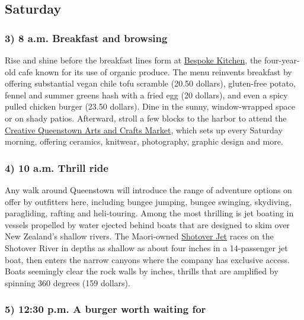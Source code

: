 \hypertarget{saturday}{%
\subsection{Saturday}\label{saturday}}

\hypertarget{3-8-am-breakfast-and-browsing}{%
\subsubsection{\texorpdfstring{\textbf{3) 8 a.m. Breakfast and
browsing}}{3) 8 a.m. Breakfast and browsing}}\label{3-8-am-breakfast-and-browsing}}

Rise and shine before the breakfast lines form at
\href{https://www.bespokekitchen.co.nz/}{Bespoke Kitchen}, the
four-year-old cafe known for its use of organic produce. The menu
reinvents breakfast by offering substantial vegan chile tofu scramble
(20.50 dollars), gluten-free potato, fennel and summer greens hash with
a fried egg (20 dollars), and even a spicy pulled chicken burger (23.50
dollars). Dine in the sunny, window-wrapped space or on shady patios.
Afterward, stroll a few blocks to the harbor to attend the
\href{http://www.queenstownmarket.com/}{Creative Queenstown Arts and
Crafts Market}, which sets up every Saturday morning, offering ceramics,
knitwear, photography, graphic design and more.

\hypertarget{4-10-am-thrill-ride}{%
\subsubsection{\texorpdfstring{\textbf{4) 10 a.m. Thrill
ride}}{4) 10 a.m. Thrill ride}}\label{4-10-am-thrill-ride}}

Any walk around Queenstown will introduce the range of adventure options
on offer by outfitters here, including bungee jumping, bungee swinging,
skydiving, paragliding, rafting and heli-touring. Among the most
thrilling is jet boating in vessels propelled by water ejected behind
boats that are designed to skim over New Zealand's shallow rivers. The
Maori-owned \href{https://www.shotoverjet.com/}{Shotover Jet} races on
the Shotover River in depths as shallow as about four inches in a
14-passenger jet boat, then enters the narrow canyons where the company
has exclusive access. Boats seemingly clear the rock walls by inches,
thrills that are amplified by spinning 360 degrees (159 dollars).

\hypertarget{5-1230-pm-a-burger-worth-waiting-for}{%
\subsubsection{\texorpdfstring{\textbf{5) 12:30 p.m. A burger worth
waiting
for}}{5) 12:30 p.m. A burger worth waiting for}}\label{5-1230-pm-a-burger-worth-waiting-for}}

